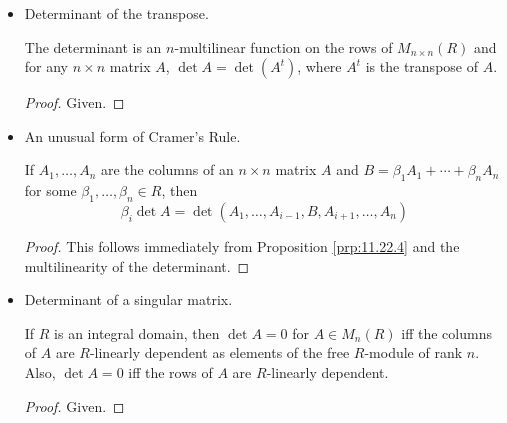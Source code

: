 \documentclass[../notes.tex]{subfiles}
\begin{document}
\begin{itemize}
    \begin{theorem}\label{trm:11.24}
        There is a unique $n\times n$ determinant function on $R$ and it can be computed for any $n\times n$ matrix $(\alpha_{ij})$ by the formula
        \begin{equation*}
            \det(\alpha_{ij}) = \sum_{\sigma\in S_n}\sgn(\sigma)\alpha_{\sigma(1)1}\cdots\alpha_{\sigma(n)n}
        \end{equation*}
        \begin{proof}
            Given.
        \end{proof}
    \end{theorem}
    \item Determinant of the transpose.
    \begin{corollary}\label{cly:11.25}
        The determinant is an $n$-multilinear function on the rows of $M_{n\times n}(R)$ and for any $n\times n$ matrix $A$, $\det A=\det(A^t)$, where $A^t$ is the transpose of $A$.
        \begin{proof}
            Given.
        \end{proof}
    \end{corollary}
    \item An unusual form of Cramer's Rule.
    \begin{theorem}\label{trm:11.26}
        If $A_1,\dots,A_n$ are the columns of an $n\times n$ matrix $A$ and $B=\beta_1A_1+\cdots+\beta_nA_n$ for some $\beta_1,\dots,\beta_n\in R$, then
        \begin{equation*}
            \beta_i\det A = \det(A_1,\dots,A_{i-1},B,A_{i+1},\dots,A_n)
        \end{equation*}
        \begin{proof}
            This follows immediately from Proposition \ref{prp:11.22.4} and the multilinearity of the determinant.
        \end{proof}
    \end{theorem}
    \item Determinant of a singular matrix.
    \begin{corollary}\label{cly:11.27}
        If $R$ is an integral domain, then $\det A=0$ for $A\in M_n(R)$ iff the columns of $A$ are $R$-linearly dependent as elements of the free $R$-module of rank $n$. Also, $\det A=0$ iff the rows of $A$ are $R$-linearly dependent.
        \begin{proof}
            Given.
        \end{proof}
    \end{corollary}

\end{itemize}
\end{document}
